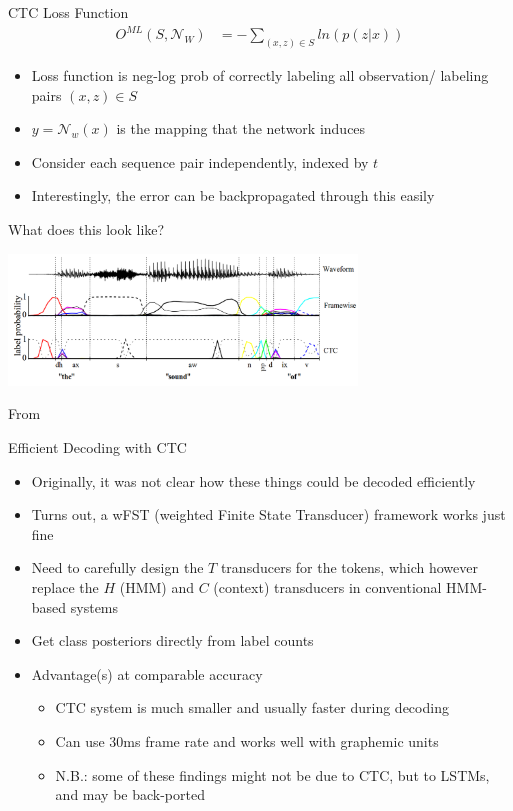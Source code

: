 \begin{frame}{CTC Loss Function}
  \begin{align}
    O^{ML}(S,\mathcal{N}_W)&=-\sum_{(x,z) \in S} ln(p(z|x))
  \end{align}
  \begin{itemize}
  \item Loss function is neg-log prob of correctly labeling all observation/ labeling pairs $(x,z) \in S$
  \item $y = \mathcal{N}_w (x)$ is the mapping that the network induces 
  \item Consider each sequence pair independently, indexed by $t$
  \item Interestingly, the error can be backpropagated through this easily
  \end{itemize}
\end{frame}

\begin{frame}{What does this look like?}
  \begin{center}
    \includegraphics[height=35mm]{figures/ctc}
  \end{center}
  \tiny From \cite{graves2006connectionist}
\end{frame}

\begin{frame}{Efficient Decoding with CTC}
  \begin{itemize}
  \item Originally, it was not clear how these things could be decoded efficiently
  \item Turns out, a wFST (weighted Finite State Transducer) framework works just fine \cite{eesen,sak2015fast}
  \item Need to carefully design the $T$ transducers for the tokens, which however replace the $H$ (HMM) and $C$ (context) transducers in conventional HMM-based systems
  \item Get class posteriors directly from label counts
  \item Advantage(s) at comparable accuracy
    \begin{itemize}
    \item CTC system is much smaller and usually faster during decoding
    \item Can use 30ms frame rate and works well with graphemic units
    \item N.B.: some of these findings might not be due to CTC, but to LSTMs, and may be back-ported
    \end{itemize}
  \end{itemize}
\end{frame}

